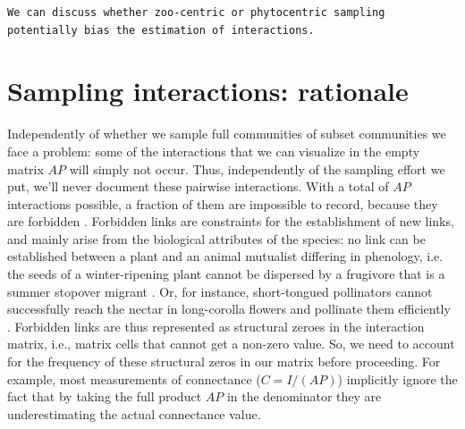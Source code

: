 \documentclass[a4paper,12pt]{article}
\begin{document}
\begin{spacing}{1.0}
\begin{verbatim}
We can discuss whether zoo-centric or phytocentric sampling potentially bias the estimation of interactions.
\end{verbatim}

\chapter{Sampling interactions: rationale}
\label{samplinginteractions:rationale}

Independently of whether we sample full communities of subset communities we face a problem: some of the interactions that we can visualize in the empty matrix $AP$ will simply not occur. Thus, independently of the sampling effort we put, we'll never document these pairwise interactions. With a total of $AP$ interactions possible, a fraction of them are impossible to record, because they are forbidden \citep{E31.7324_PDF}\citep{Olesen:2011a}. Forbidden links are constraints for the establishment of new links, and mainly arise from the biological attributes of the species: no link can be established between a plant and an animal mutualist differing in phenology, i.e. the seeds of a winter-ripening plant cannot be dispersed by a frugivore that is a summer stopover migrant \citep{E31/2562}. Or, for instance, short-tongued pollinators cannot successfully reach the nectar in long-corolla flowers and pollinate them efficiently \citep{More:2012kx}. Forbidden links are thus represented as structural zeroes in the interaction matrix, i.e., matrix cells that cannot get a non-zero value. So, we need to account for the frequency of these structural zeros in our matrix before proceeding. For example, most measurements of connectance ($C= I/(AP)$) implicitly ignore the fact that by taking the full product $AP$ in the denominator they are underestimating the actual connectance value.

\end{spacing}
\end{document}
